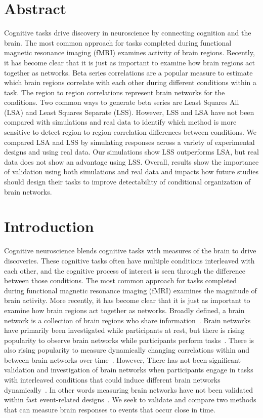 \documentclass[10pt,letterpaper]{article}
\begin{document}
\section*{Abstract}
Cognitive tasks drive discovery in neuroscience by connecting cognition and the brain.
The most common approach for tasks completed during functional magnetic resonance imaging (fMRI)
examines activity of brain regions.
Recently, it has become clear that it is just as important to examine how brain regions act together as networks.
Beta series correlations are a popular measure to estimate which brain regions correlate with
each other during different conditions within a task.
The region to region correlations represent brain networks for the conditions.
Two common ways to generate beta series are Least Squares All (LSA) and
Least Squares Separate (LSS).
However, LSS and LSA have not been compared with simulations and real data
to identify which method is more sensitive to detect region to region correlation differences
between conditions.
We compared LSA and LSS by simulating responses across a variety of
experimental designs and using real data.
Our simulations show LSS outperforms LSA, but real data
does not show an advantage using LSS.
Overall, results show the importance of validation using both simulations
and real data and impacts how future studies should design their tasks
to improve detectability of conditional organization of brain networks.

\linenumbers

\section*{Introduction}
\label{intro}

Cognitive neuroscience blends cognitive tasks with measures of the brain to drive discoveries.
These cognitive tasks often have multiple conditions interleaved with each other,
and the cognitive process of interest is seen through the difference between those conditions.
The most common approach for tasks completed during functional magnetic resonance imaging (fMRI)
examines the magnitude of brain activity.
More recently, it has become clear that it is just as important to examine how brain regions act together as networks.
Broadly defined, a brain network is a collection of brain regions who share information~\cite{Uddin2019}.
Brain networks have primarily been investigated while participants at rest, but there
is rising popularity to observe brain networks while participants perform tasks~\cite{Cole2014a}.
There is also rising popularity to measure dynamically changing correlations within and between brain networks over time~\cite{Sakoglu2008,Hindriks2016}.
However, There has not been significant validation and investigation of brain networks
when participants engage in tasks with interleaved conditions that could induce
different brain networks dynamically~\cite{Di2019a}.
In other words measuring brain networks have not been validated within fast event-related designs~\cite{Buckner1998}.
We seek to validate and compare two methods that can measure brain responses to events that occur
close in time.
\end{document}
